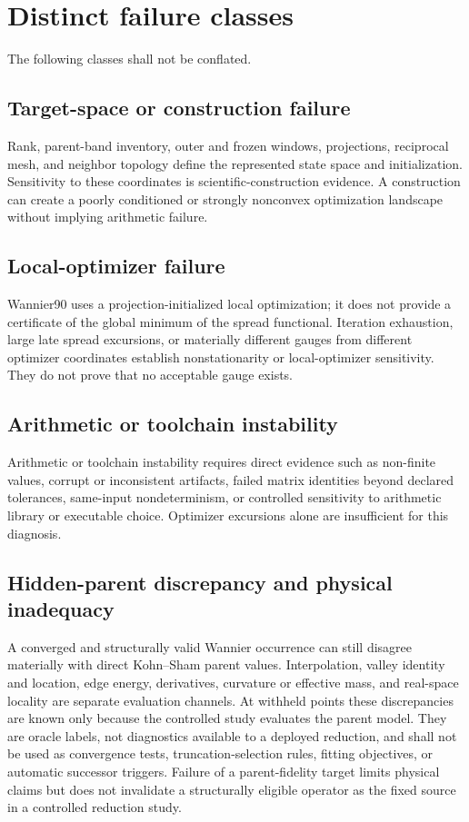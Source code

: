 \documentclass[11pt]{report}
\begin{document}
\chapter{Distinct failure classes}

The following classes shall not be conflated.

\section{Target-space or construction failure}

Rank, parent-band inventory, outer and frozen windows, projections, reciprocal mesh, and
neighbor topology define the represented state space and initialization.  Sensitivity to
these coordinates is scientific-construction evidence.  A construction can create a
poorly conditioned or strongly nonconvex optimization landscape without implying
arithmetic failure.

\section{Local-optimizer failure}

Wannier90 uses a projection-initialized local optimization; it does not provide a
certificate of the global minimum of the spread functional.  Iteration exhaustion,
large late spread excursions, or materially different gauges from different optimizer
coordinates establish nonstationarity or local-optimizer sensitivity.  They do not prove
that no acceptable gauge exists.

\section{Arithmetic or toolchain instability}

Arithmetic or toolchain instability requires direct evidence such as non-finite values,
corrupt or inconsistent artifacts, failed matrix identities beyond declared tolerances,
same-input nondeterminism, or controlled sensitivity to arithmetic library or executable
choice.  Optimizer excursions alone are insufficient for this diagnosis.

\section{Hidden-parent discrepancy and physical inadequacy}

A converged and structurally valid Wannier occurrence can still disagree materially
with direct Kohn--Sham parent values.  Interpolation, valley identity and location, edge
energy, derivatives, curvature or effective mass, and real-space locality are separate
evaluation channels.  At withheld points these discrepancies are known only because the
controlled study evaluates the parent model.  They are oracle labels, not diagnostics
available to a deployed reduction, and shall not be used as convergence tests,
truncation-selection rules, fitting objectives, or automatic successor triggers.
Failure of a parent-fidelity target limits physical claims but does not invalidate a
structurally eligible operator as the fixed source in a controlled reduction study.
\end{document}
